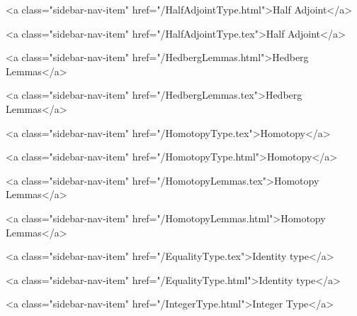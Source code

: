           <a class="sidebar-nav-item" href="/HalfAdjointType.html">Half Adjoint</a>
        
      
    
      
        
          <a class="sidebar-nav-item" href="/HalfAdjointType.tex">Half Adjoint</a>
        
      
    
      
        
          <a class="sidebar-nav-item" href="/HedbergLemmas.html">Hedberg Lemmas</a>
        
      
    
      
        
          <a class="sidebar-nav-item" href="/HedbergLemmas.tex">Hedberg Lemmas</a>
        
      
    
      
        
          <a class="sidebar-nav-item" href="/HomotopyType.tex">Homotopy</a>
        
      
    
      
        
          <a class="sidebar-nav-item" href="/HomotopyType.html">Homotopy</a>
        
      
    
      
        
          <a class="sidebar-nav-item" href="/HomotopyLemmas.tex">Homotopy Lemmas</a>
        
      
    
      
        
          <a class="sidebar-nav-item" href="/HomotopyLemmas.html">Homotopy Lemmas</a>
        
      
    
      
        
          <a class="sidebar-nav-item" href="/EqualityType.tex">Identity type</a>
        
      
    
      
        
          <a class="sidebar-nav-item" href="/EqualityType.html">Identity type</a>
        
      
    
      
        
          <a class="sidebar-nav-item" href="/IntegerType.html">Integer Type</a>
        
      
    
      
        
